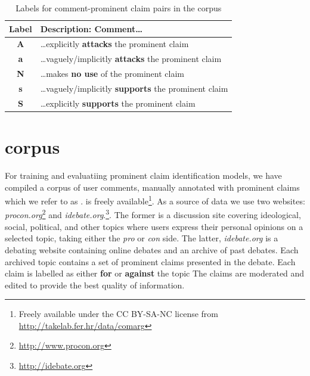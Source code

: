 \begin{table}
\centering
{\small
\begin{tabular}{cl}
\toprule
Label & Description: Comment\dots \\
\midrule
\textbf{A} & \dots explicitly \textbf{attacks} the prominent claim \\
\textbf{a} & \dots vaguely/implicitly \textbf{attacks} the prominent claim \\
\textbf{N} & \dots makes \textbf{no use} of the prominent claim \\
\textbf{s} & \dots vaguely/implicitly \textbf{supports} the prominent claim \\
\textbf{S} & \dots explicitly \textbf{supports} the prominent claim \\
\bottomrule
\end{tabular}
}
\caption{Labels for comment-prominent claim pairs in the \ComArg corpus}
\label{tab:comarg-labels}
\end{table}

\section{\ComArg corpus}
\label{sec:comarg}

For training and evaluatiing prominent claim identification models, 
we have compiled a corpus of user comments, manually annotated
with prominent claims which we refer to as \ComArg. \ComArg is
freely available\footnote{Freely available under the CC BY-SA-NC license from
\url{http://takelab.fer.hr/data/comarg}}. 
As a source of data we use two websites:
\emph{procon.org}\footnote{\url{http://www.procon.org}} and 
\textit{idebate.org}.\footnote{\url{http://idebate.org}}. 
The former is a discussion site covering ideological, social, political, and
other topics where users express their personal opinions on a selected topic,
taking either the \textit{pro} or \textit{con} side.  The latter,
\textit{idebate.org} is a debating website containing online debates and an
archive of past debates.  Each archived topic contains a set of prominent
claims presented in the debate.  Each claim is labelled as either \textbf{for}
or \textbf{against} the topic The claims are moderated and edited to provide
the best quality of information. 

